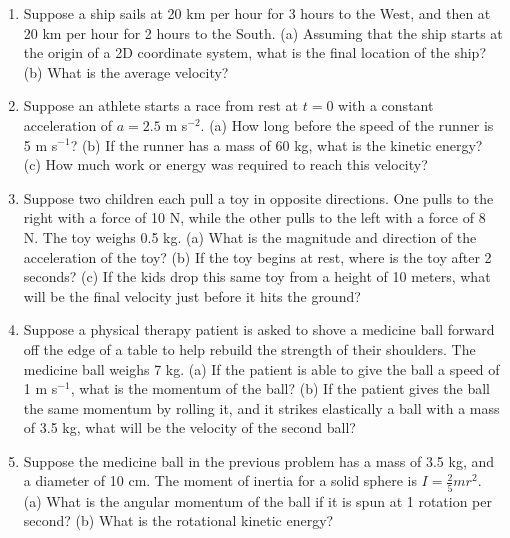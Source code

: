 \documentclass{article}
\begin{document}
\begin{enumerate}
\item Suppose a ship sails at 20 km per hour for 3 hours to the West, and then at 20 km per hour for 2 hours to the South.  (a) Assuming that the ship starts at the origin of a 2D coordinate system, what is the final location of the ship? (b) What is the average velocity? \\ \vspace{2.5cm}
\item Suppose an athlete starts a race from rest at $t=0$ with a constant acceleration of $a = 2.5$ m s$^{-2}$.  (a) How long before the speed of the runner is 5 m s$^{-1}$? (b) If the runner has a mass of 60 kg, what is the kinetic energy? (c) How much work or energy was required to reach this velocity? \\ \vspace{2.5cm}
\item Suppose two children each pull a toy in opposite directions.  One pulls to the right with a force of 10 N, while the other pulls to the left with a force of 8 N.  The toy weighs 0.5 kg. (a) What is the magnitude and direction of the acceleration of the toy? (b) If the toy begins at rest, where is the toy after 2 seconds? (c) If the kids drop this same toy from a height of 10 meters, what will be the final velocity just before it hits the ground? \\ \vspace{2.5cm}
\item Suppose a physical therapy patient is asked to shove a medicine ball forward off the edge of a table to help rebuild the strength of their shoulders.  The medicine ball weighs 7 kg.  (a) If the patient is able to give the ball a speed of 1 m s$^{-1}$, what is the momentum of the ball? (b) If the patient gives the ball the same momentum by rolling it, and it strikes elastically a ball with a mass of 3.5 kg, what will be the velocity of the second ball? \\ \vspace{2.5cm}
\item Suppose the medicine ball in the previous problem has a mass of 3.5 kg, and a diameter of 10 cm.  The moment of inertia for a solid sphere is $I = \frac{2}{5} m r^2$. (a) What is the angular momentum of the ball if it is spun at 1 rotation per second? (b) What is the rotational kinetic energy?
\end{enumerate}
\end{document}

